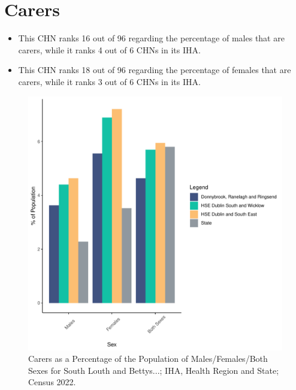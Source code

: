 \documentclass{article}
\begin{document}
\section{Carers}\label{sect:Carers}
\begin{itemize}
\item This CHN ranks  16 out of 96 regarding the percentage of males that are carers, while it ranks   4 out of 6 CHNs in its IHA.
\item This CHN ranks  18 out of 96 regarding the percentage of females that are carers, while it ranks   3 out of 6 CHNs in its IHA.
\end{itemize}
\begin{figure}[H]
	\centering
	\includegraphics[width = 150mm]{../figures/CareED.pdf}
	\caption{Carers as a Percentage of the Population of Males/Females/Both Sexes for South Louth and Bettys...; IHA, Health Region and State; Census 2022.}
	\label{fig:2ae19629-1a6a-13a3-e055-000000000001}
	\end{figure}
\end{document}
